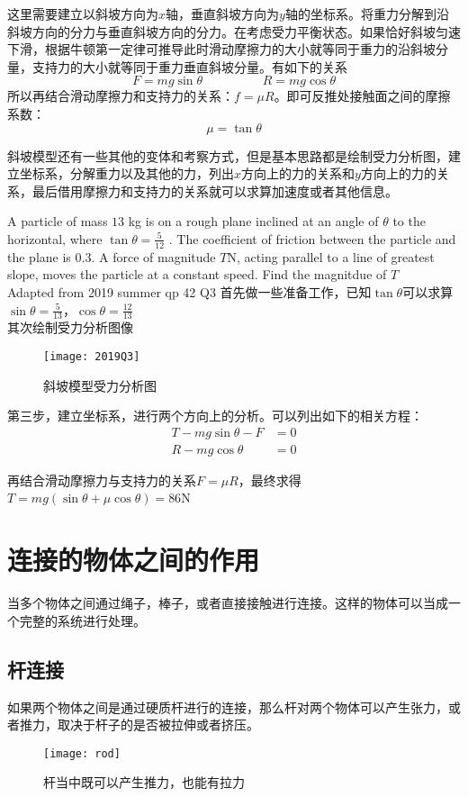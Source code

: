 这里需要建立以斜坡方向为$x$轴，垂直斜坡方向为$y$轴的坐标系。将重力分解到沿斜坡方向的分力与垂直斜坡方向的分力。在考虑受力平衡状态。如果恰好斜坡匀速下滑，根据牛顿第一定律可推导此时滑动摩擦力的大小就等同于重力的沿斜坡分量，支持力的大小就等同于重力垂直斜坡分量。有如下的关系
\[
	F=mg\sin \theta \hspace{2cm} R=mg\cos\theta
\]
所以再结合滑动摩擦力和支持力的关系：$f=\mu R$。即可反推处接触面之间的摩擦系数：
\[
	\mu =\tan \theta
\]

斜坡模型还有一些其他的变体和考察方式，但是基本思路都是绘制受力分析图，建立坐标系，分解重力以及其他的力，列出$x$方向上的力的关系和$y$方向上的力的关系，最后借用摩擦力和支持力的关系就可以求算加速度或者其他信息。

\begin{ExampleBox}
A particle of mass $13$ \si{\kg} is on a rough plane inclined at an angle of $\theta$ to the horizontal, where $\tan \theta =\frac{5}{12}$ . The coefficient of friction between the particle and the plane is $0.3$. A force of magnitude $T$\si{\N}, acting parallel to a line of greatest slope, moves the particle at a constant speed. Find the magnitdue of $T$\\
\makebox{}\hfill Adapted from 2019 summer qp 42 Q3
\tcblower
首先做一些准备工作，已知$\tan \theta$可以求算$\sin \theta=\frac{5}{13}$，$\cos \theta=\frac{12}{13}$\\
其次绘制受力分析图像
\begin{figure}[H]
\centering
\texttt{[image: 2019Q3]}
\caption{斜坡模型受力分析图}
\end{figure}

第三步，建立坐标系，进行两个方向上的分析。可以列出如下的相关方程：
\begin{align*}
T-mg\sin\theta-F &=0\\
R-mg\cos\theta &=0
\end{align*}

再结合滑动摩擦力与支持力的关系$F=\mu R$，最终求得$T=mg(\sin\theta+\mu \cos\theta)=86$\si{\N}
\end{ExampleBox}

\section{连接的物体之间的作用}
\label{sec:Connected Particles}
当多个物体之间通过绳子，棒子，或者直接接触进行连接。这样的物体可以当成一个完整的系统进行处理。

\subsection*{杆连接}
如果两个物体之间是通过硬质杆进行的连接，那么杆对两个物体可以产生张力，或者推力，取决于杆子的是否被拉伸或者挤压。
\begin{figure}[H]
\centering
\texttt{[image: rod]}
\caption{杆当中既可以产生推力，也能有拉力}
\end{figure}

